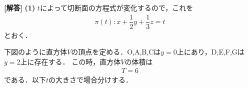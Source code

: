 \documentclass[../../main.tex]{subfiles}
\begin{document}
\begin{oframed}
  
\end{oframed}

{\bf [解答]}
\textbf{(1)}
$t$によって切断面の方程式が変化するので，これを
\begin{align}
  \pi(t): x+\dfrac{1}{2}y+\dfrac{1}{3}z=t \label{eq:1}
\end{align}
とおく．

下図のように直方体$V$の頂点を定める．O,A,B,Cは$y=0$上にあり，D,E,F,Gは$y=2$上に存在する．
この時，直方体$V$の体積は
\begin{align}
  T = 6 \label{eq:2}
\end{align}
である．以下$t$の大きさで場合分けする．

\end{document}
